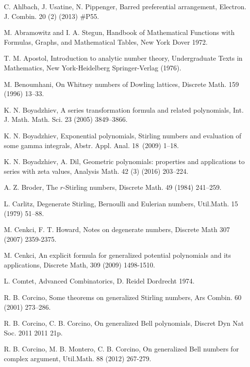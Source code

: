 \documentclass{article}%
\begin{document}
\begin{thebibliography}{99}                                                                                               %


C. Ahlbach, J. Usatine, N. Pippenger, Barred preferential
arrangement, Electron. J. Combin. 20 (2) (2013) \#P55.

M. Abramowitz and I. A. Stegun, Handbook of Mathematical
Functions with Formulas, Graphs, and Mathematical Tables, New York Dover 1972.

T. M. Apostol, Introduction to analytic number theory,
Undergraduate Texts in Mathematics, New York-Heidelberg Springer-Verlag (1976).

M. Benoumhani, On Whitney numbers of Dowling lattices,
Discrete Math. 159 (1996) 13--33.

K. N. Boyadzhiev, A series transformation formula and related
polynomials, Int. J. Math. Math. Sci. 23 (2005) 3849--3866.

K. N. Boyadzhiev, Exponential polynomials, Stirling numbers and
evaluation of some gamma integrals, Abstr. Appl. Anal. 18\ (2009) 1--18.

K. N. Boyadzhiev, A. Dil, Geometric polynomials: properties
and applications to series with zeta values, Analysis Math. 42 (3) (2016) 203--224.

A. Z. Broder, The $r$-Stirling numbers, Discrete Math. 49
(1984) 241--259.

L. Carlitz, Degenerate Stirling, Bernoulli and Eulerian
numbers, Util.Math. 15 (1979) 51--88.

M. Cenkci, F. T. Howard, Notes on degenerate numbers,
Discrete Math 307 (2007) 2359-2375.

M. Cenkci, An explicit formula for generalized potential
polynomials and its applications, Discrete Math, 309 (2009) 1498-1510.

L. Comtet, Advanced Combinatorics, D. Reidel Dordrecht 1974.

R. B. Corcino, Some theorems on generalized Stirling
numbers, Ars Combin. 60 (2001) 273--286.

R. B. Corcino, C. B. Corcino, On generalized Bell
polynomials, Discret Dyn Nat Soc. 2011 2011 21p.

R. B. Corcino, M. B. Montero, C. B. Corcino, On generalized
Bell numbers for complex argument, Util.Math. 88 (2012) 267-279.


\end{thebibliography}
\end{document}
